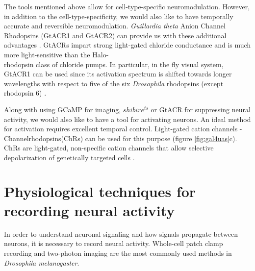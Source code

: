 The tools mentioned above allow for cell-type-specific neuromodulation. However, in addition to the cell-type-specificity, we would also like to have temporally accurate and reversible neuromodulation. \textit{Guillardia theta} Anion Channel Rhodopsins (GtACR1 and GtACR2) can provide us with these additional advantages \parencite{Govorunova2015}. GtACRs impart strong light-gated chloride conductance and is much more light-sensitive than the Halo-\\rhodopsin class of chloride pumps. In particular, in the fly visual system, GtACR1 can be used since its activation spectrum is shifted towards longer wavelengths with respect to five of the six \textit{Drosophila} rhodopsins (except rhodopsin 6) \parencite{Mauss2017, Mohammad2017}. %
 
Along with using GCaMP for imaging, $shibire^{ts}$ or GtACR for suppressing neural activity, we would also like to have a tool for activating neurons. An ideal method for activation requires excellent temporal control. Light-gated cation channels - Channelrhodopsins(ChRs) can be used for this purpose (figure  \ref{fig:gal4uas}c). ChRs are light-gated, non-specific cation channels that allow selective depolarization of genetically targeted cells \parencite{Lin2013, Busch2018}. 

\section{Physiological techniques for recording neural activity}
In order to understand neuronal signaling and how signals propagate between neurons, it is necessary to record neural activity. Whole-cell patch clamp recording and two-photon imaging are the most commonly used methods in \textit{Drosophila melanogaster}.

